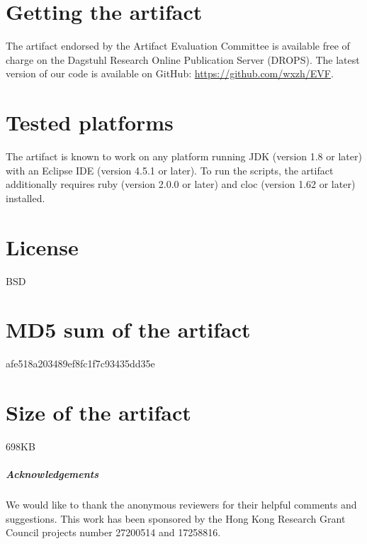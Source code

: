 \documentclass[a4paper,UKenglish]{darts}
\newenvironment{getting}{\section{Getting the artifact} The artifact 
endorsed by the Artifact Evaluation Committee is available free of 
charge on the Dagstuhl Research Online Publication Server (DROPS).}{}
\newenvironment{platforms}{\section{Tested platforms}}{}
\newcommand{\license}[1]{{\section{License}#1}}
\newcommand{\mdsum}[1]{{\section{MD5 sum of the artifact}#1}}
\newcommand{\artifactsize}[1]{{\section{Size of the artifact}#1}}
\begin{document}
\begin{getting}
  The latest version of our code is available on GitHub:
  \url{https://github.com/wxzh/EVF}.
\end{getting}

\begin{platforms}
  The artifact is known to work on any platform running JDK (version 1.8 or later)
  with an Eclipse IDE (version 4.5.1 or later). To run the scripts, the artifact additionally requires ruby
  (version 2.0.0 or later) and cloc (version 1.62 or later) installed.
\end{platforms}

\license{BSD}

\mdsum{afe518a203489ef8fc1f7c93435dd35e}

\artifactsize{698KB}

\subparagraph*{Acknowledgements}

We would like to thank the anonymous reviewers for their helpful comments and suggestions. This work has been sponsored by the Hong Kong Research Grant Council projects number 27200514 and 17258816.







%

\end{document}
